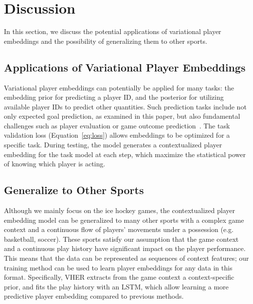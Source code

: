 \documentclass[letterpaper]{article} %
\begin{document}
\section{Discussion}
In this section, we discuss the potential applications of variational player embeddings and the possibility of generalizing %
them to other sports.

\subsection{Applications of Variational Player Embeddings}

Variational player embeddings can potentially be applied for many tasks: the embedding prior for predicting a player ID, and the posterior for utilizing available player IDs to predict other quantities. 
Such prediction tasks include not only expected goal prediction, as examined in this paper, but also fundamental challenges such as player evaluation or game outcome prediction~\cite{ganguly2018problem}. The task validation loss (Equation~\eqref{eq:loss}) allows embeddings to be optimized for a specific task. 
During testing, the model generates a contextualized player embedding for the task model at each step, which maximize the statistical power of knowing which player is acting.



\subsection{Generalize to Other Sports}
Although we mainly focus on the ice hockey games, the contextualized player embedding model can be generalized to many other sports with a complex game context and a continuous flow of players' movements under a possession (e.g. basketball, soccer). These sports satisfy our assumption that the game context and a continuous play history have significant impact on the player performance. This means that the data can be represented as sequences of context features; our training method can be used to learn player embeddings for any data in this format. Specifically, 
VHER extracts from the game context a context-specific prior, and fits the play history with an LSTM, which allow learning a more predictive player embedding compared to previous methods.
\end{document}
